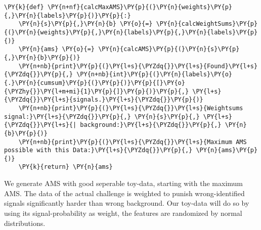 {\par%
\vspace{-1\baselineskip}%
}%
\begin{notebookcell}[]%
\begin{addmargin}[\cellleftmargin]{0em}%
{\smaller%
\par%
%
\vspace{-1\smallerfontscale}%
\begin{Verbatim}[commandchars=\\\{\}]
\PY{k}{def} \PY{n+nf}{calcMaxAMS}\PY{p}{(}\PY{n}{weights}\PY{p}{,}\PY{n}{labels}\PY{p}{)}\PY{p}{:}
    \PY{n}{s}\PY{p}{,}\PY{n}{b} \PY{o}{=} \PY{n}{calcWeightSums}\PY{p}{(}\PY{n}{weights}\PY{p}{,}\PY{n}{labels}\PY{p}{,}\PY{n}{labels}\PY{p}{)}
    \PY{n}{ams} \PY{o}{=} \PY{n}{calcAMS}\PY{p}{(}\PY{n}{s}\PY{p}{,}\PY{n}{b}\PY{p}{)}
    \PY{n+nb}{print}\PY{p}{(}\PY{l+s}{\PYZdq{}}\PY{l+s}{Found}\PY{l+s}{\PYZdq{}}\PY{p}{,} \PY{n+nb}{int}\PY{p}{(}\PY{n}{labels}\PY{o}{.}\PY{n}{cumsum}\PY{p}{(}\PY{p}{)}\PY{p}{[}\PY{o}{\PYZhy{}}\PY{l+m+mi}{1}\PY{p}{]}\PY{p}{)}\PY{p}{,} \PY{l+s}{\PYZdq{}}\PY{l+s}{signals.}\PY{l+s}{\PYZdq{}}\PY{p}{)}
    \PY{n+nb}{print}\PY{p}{(}\PY{l+s}{\PYZdq{}}\PY{l+s}{Weightsums signal:}\PY{l+s}{\PYZdq{}}\PY{p}{,} \PY{n}{s}\PY{p}{,} \PY{l+s}{\PYZdq{}}\PY{l+s}{| background:}\PY{l+s}{\PYZdq{}}\PY{p}{,} \PY{n}{b}\PY{p}{)}
    \PY{n+nb}{print}\PY{p}{(}\PY{l+s}{\PYZdq{}}\PY{l+s}{Maximum AMS possible with this Data:}\PY{l+s}{\PYZdq{}}\PY{p}{,} \PY{n}{ams}\PY{p}{)}
    \PY{k}{return} \PY{n}{ams}
\end{Verbatim}
%
\par%
\vspace{-1\smallerfontscale}}%
\end{addmargin}
\end{notebookcell}


    We generate AMS with good seperable toy-data, starting with the maximum
AMS. The data of the actual challenge is weighted to punish
wrong-identified signals significantly harder than wrong background. Our
toy-data will do so by using its signal-probability as weight, the
features are randomized by normal distributions.


